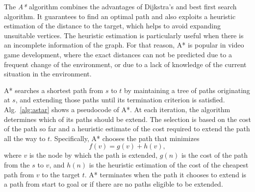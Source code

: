 The \emph{A*} algorithm \cite{hart68} combines the advantages of Dijkstra's and best first search algorithm.
It guarantees to find an optimal path and also exploits a heuristic estimation of the distance to the target, which helps to avoid expanding unsuitable vertices.
The heuristic estimation is particularly useful when there is an incomplete information of the graph.
For that reason, A* is popular in video game development, where the exact distances can not be predicted due to a frequent change of the environment, 
or due to a lack of knowledge of the current situation in the environment.

A* searches a shortest path from $s$ to $t$ by maintaining a tree of paths originating at $s$, and extending those paths until its termination criterion is satisfied.
Alg.~\ref{alg:astar} shows a pseudocode of A*.
At each iteration, the algorithm determines which of its paths should be extend. 
The selection is based on the cost of the path so far and a heuristic estimate of the cost required to extend the path all the way to $t$. 
Specifically, A* chooses the path that minimizes
$$
    f(v)=g(v)+h(v),
$$
where $v$ is the node by which the path is extended, $g(n)$ is the cost of the path from the $s$ to $v$, 
and $h(n)$ is the heuristic estimation of the cost of the cheapest path from $v$ to the target $t$. 
A* terminates when the path it chooses to extend is a path from start to goal or if there are no paths eligible to be extended.

